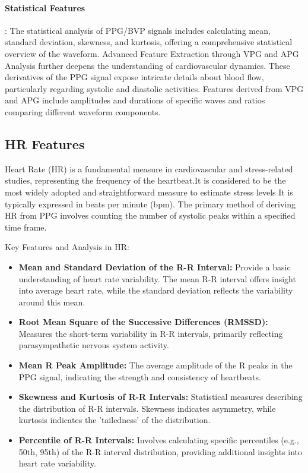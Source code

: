 \paragraph*{Statistical Features}: The statistical analysis of PPG/BVP signals includes calculating mean, standard deviation, skewness, and kurtosis, offering a comprehensive statistical overview of the waveform.
Advanced Feature Extraction through VPG and APG Analysis further deepens the understanding of cardiovascular dynamics. These derivatives of the PPG signal expose intricate details about blood flow, particularly regarding systolic and diastolic activities. Features derived from VPG and APG include amplitudes and durations of specific waves and ratios comparing different waveform components.

\subsection*{HR Features}
Heart Rate (HR) is a fundamental measure in cardiovascular and stress-related studies, representing the frequency of the heartbeat.It is considered to be the most widely adopted and straightforward measure to estimate stress levels \parencite{review1} It is typically expressed in beats per minute (bpm). The primary method of deriving HR from PPG involves counting the number of systolic peaks within a specified time frame.

Key Features and Analysis in HR:
\begin{itemize}
  \item \textbf{Mean and Standard Deviation of the R-R Interval:} Provide a basic understanding of heart rate variability. The mean R-R interval offers insight into average heart rate, while the standard deviation reflects the variability around this mean.
  
  \item \textbf{Root Mean Square of the Successive Differences (RMSSD):} Measures the short-term variability in R-R intervals, primarily reflecting parasympathetic nervous system activity.
  
  \item \textbf{Mean R Peak Amplitude:} The average amplitude of the R peaks in the PPG signal, indicating the strength and consistency of heartbeats.
  
  \item \textbf{Skewness and Kurtosis of R-R Intervals:} Statistical measures describing the distribution of R-R intervals. Skewness indicates asymmetry, while kurtosis indicates the 'tailedness' of the distribution.
  
  \item \textbf{Percentile of R-R Intervals:} Involves calculating specific percentiles (e.g., 50th, 95th) of the R-R interval distribution, providing additional insights into heart rate variability.
\end{itemize}



